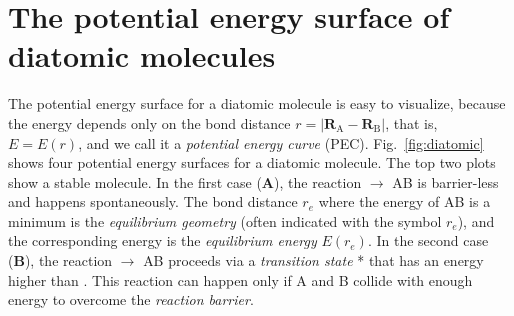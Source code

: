 \documentclass[../Main/chem371-notes.tex]{subfiles}
\begin{document}
\section{The potential energy surface of diatomic molecules}

The potential energy surface for a diatomic molecule  is easy to visualize, because the energy depends only on the bond distance $r = |\mathbf{R}_\mathrm{A} - \mathbf{R}_\mathrm{B}|$, that is, $E = E(r)$, and we call it a \emph{potential energy curve} (PEC).
Fig.~\ref{fig:diatomic} shows four potential energy surfaces for a diatomic molecule.
The top two plots show a stable  molecule.
In the first case (\textbf{A}), the reaction  $\rightarrow$ {AB} is barrier-less and happens spontaneously.
The bond distance $r_e$ where the energy of AB is a minimum is the \emph{equilibrium geometry} (often indicated with the symbol $r_e$), and the corresponding energy is the \emph{equilibrium energy} $E(r_e)$.
In the second case  (\textbf{B}),  the reaction  $\rightarrow$ {AB} proceeds via a \emph{transition state} * that has an energy higher than .
This reaction can happen only if A and B collide with enough energy to overcome the \emph{reaction barrier}.
\end{document}

